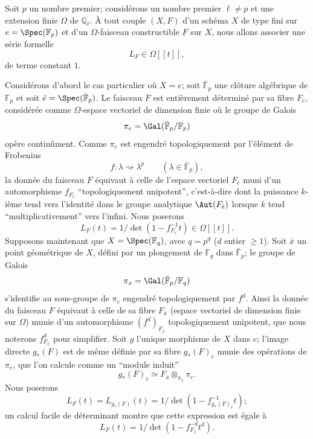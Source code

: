 Soit $p$ un nombre premier; considérons un nombre premier $\ell\ne p$ et une extension finie $\Omega$ de $\mathbb{Q}_\ell$. À tout couple $(X,F)$ d'un schéma $X$ de type fini sur $e=\Spec(\mathbb{F}_p)$ et d'un $\Omega$-faisceau constructible $F$ sur $X$, nous allons associer une série formelle
\[
L_F\in\Omega[[t]],
\]
de terme constant $1$.


Considérons d'abord le cas particulier où $X=e$; soit $\bar{\mathbb{F}}_p$ une clôture algébrique de $\mathbb{F}_p$ et soit $\bar e=\Spec(\bar{\mathbb{F}}_p)$. Le faisceau $F$ est entièrement déterminé par sa fibre $F_{\bar e}$, considérée comme $\Omega$-espace vectoriel de dimension finie où le groupe de Galois
\[
\pi_e=\Gal(\bar{\mathbb{F}}_p/\mathbb{F}_p)
\]
opère continûment. Comme $\pi_e$ est engendré topologiquement par l'élément de Frobenius
\[
f: \lambda\rightsquigarrow \lambda^p\qquad(\lambda\in\bar{\mathbb{F}}_p),
\]
la donnée du faisceau $F$ équivaut à celle de l'espace vectoriel $F_{\bar e}$ muni d'un automorphisme $f_{F_{\bar e}}$ ``topologiquement unipotent'', c'est-à-dire dont la puissance $k$-ième tend vers l'identité dans le groupe analytique $\Aut(F_{\bar e})$ lorsque $k$ tend ``multiplicativement'' vers l'infini. Nous poserons
\[
L_F(t)=1/\det(1-f_{F_{\bar e}}^{-1}t)\in\Omega[[t]].
\]
Supposons maintenant que $X=\Spec(\mathbb{F}_q)$, avec $q=p^d$ ($d$ entier $\ge1$). Soit $\bar x$ un point géométrique de $X$, défini par un plongement de $\mathbb{F}_q$ dans $\bar{\mathbb{F}}_p$; le groupe de Galois
\[
\pi_x=\Gal(\bar{\mathbb{F}}_p/\mathbb{F}_q)
\]
s'identifie au sous-groupe de $\pi_e$ engendré topologiquement par $f^d$. Ainsi la donnée du faisceau $F$ équivaut à celle de sa fibre $F_{\bar x}$ (espace vectoriel de dimension finie sur $\Omega$) munie d'un automorphisme $(f^d)_{F_{\bar x}}$ topologiquement unipotent, que nous noterons $f^d_{F_{\bar x}}$ pour simplifier. Soit $g$ l'unique morphisme de $X$ dans $e$; l'image directe $g_*(F)$ est de même définie par sa fibre $g_*(F)_{\bar e}$ munie des opérations de $\pi_e$, que l'on calcule comme un ``module induit''
\[
g_*(F)_{\bar e}\simeq F_{\bar x}\otimes_{\pi_x}\pi_e.
\]
Nous poserons
\[
L_F(t)=L_{g_*(F)}(t)=1/\det(1-f^{-1}_{g_*(F)_{\bar e}}t);
\]
un calcul facile de déterminant montre que cette expression est égale 
à
\[
L_F(t)=1/\det(1-f^{-d}_{F_{\bar x}}t^d).
\]

